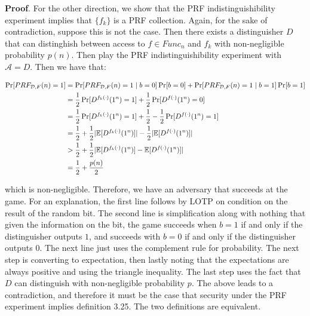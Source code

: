 \documentclass{article}
\begin{document}
\begin{enumerate}
\begin{mdbmarginx}{1ex}{0pt}{1ex}{0pt}%
\noindent{}\textbf{Proof}.  For the other direction, we show that the PRF indistinguishibility experiment implies that 
$\{f_k\}$ is a PRF collection. Again, for the sake of contradiction, suppose this is not the case.
Then there exists a distinguisher $D$ that can distinghish between access to $f \in Func_n$ and
$f_k$ with non-negligible probability $p(n)$. Then play the PRF indistinguishibility experiment with $\mathcal{A} = D$. Then we have that:%
\end{mdbmarginx}%
\noindent\noindent\[%
\begin{aligned}
\Pr[PRF_{\mathcal{D},F}(n) = 1] &= \Pr[PRF_{\mathcal{D},F}(n) = 1 \mid b = 0]\Pr[b = 0] + \Pr[PRF_{\mathcal{D},F}(n) = 1 \mid b = 1]\Pr[b = 1] \\
&= \frac{1}{2}\Pr[D^{f_k(\cdot)}(1^n) = 1] + \frac{1}{2}\Pr[D^{f(\cdot)}(1^n) = 0] \\
&= \frac{1}{2}\Pr[D^{f_k(\cdot)}(1^n) = 1] + \frac{1}{2} - \frac{1}{2}\Pr[D^{f(\cdot)}(1^n) = 1] \\
&=  \frac{1}{2} + \frac{1}{2}|\E[D^{f_k(\cdot)}(1^n)]| - \frac{1}{2}|\E[D^{f(\cdot)}(1^n)]| \\
&> \frac{1}{2} + \frac{1}{2}|\E[D^{f_k(\cdot)}(1^n)] - \E[D^{f(\cdot)}(1^n)]| \\
&= \frac{1}{2} + \frac{p(n)}{2}
\end{aligned}
\]%

which is non-negligible. Therefore, we have an adversary that succeeds at the game. For an 
explanation, the first line follows by LOTP on condition on the result of the random bit. The
second line is simplification along with nothing that given the information on the bit, the
game succeeds when $b=1$ if and only if the distinguisher outputs $1$, and succeeds with $b = 0$
if and only if the distinguisher outputs $0$. The next line just uses the complement rule for 
probability. The next step is converting to expectation, then lastly noting that the expectations
are always positive and using the triangle inequality. The last step uses the fact that $D$ 
can distinguish with non-negligible probability $p$. 
The above leads to a contradiction, and therefore it must be the case that security under the
PRF experiment implies definition 3.25. The two definitions are equivalent.%


\end{enumerate}
\end{document}
